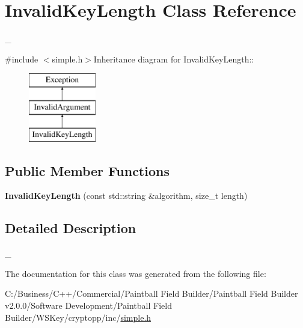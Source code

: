 \hypertarget{class_invalid_key_length}{
\section{InvalidKeyLength Class Reference}
\label{class_invalid_key_length}
}


\_\-  


{\ttfamily \#include $<$simple.h$>$}Inheritance diagram for InvalidKeyLength::\begin{figure}[H]
\begin{center}
\leavevmode
\includegraphics[height=3cm]{class_invalid_key_length}
\end{center}
\end{figure}
\subsection*{Public Member Functions}
\begin{DoxyCompactItemize}
\item 
\hypertarget{class_invalid_key_length_aab35114ece78055fbc1d891a6f99c995}{
{\bfseries InvalidKeyLength} (const std::string \&algorithm, size\_\-t length)}
\label{class_invalid_key_length_aab35114ece78055fbc1d891a6f99c995}

\end{DoxyCompactItemize}


\subsection{Detailed Description}
\_\- 

The documentation for this class was generated from the following file:\begin{DoxyCompactItemize}
\item 
C:/Business/C++/Commercial/Paintball Field Builder/Paintball Field Builder v2.0.0/Software Development/Paintball Field Builder/WSKey/cryptopp/inc/\hyperlink{simple_8h}{simple.h}\end{DoxyCompactItemize}
